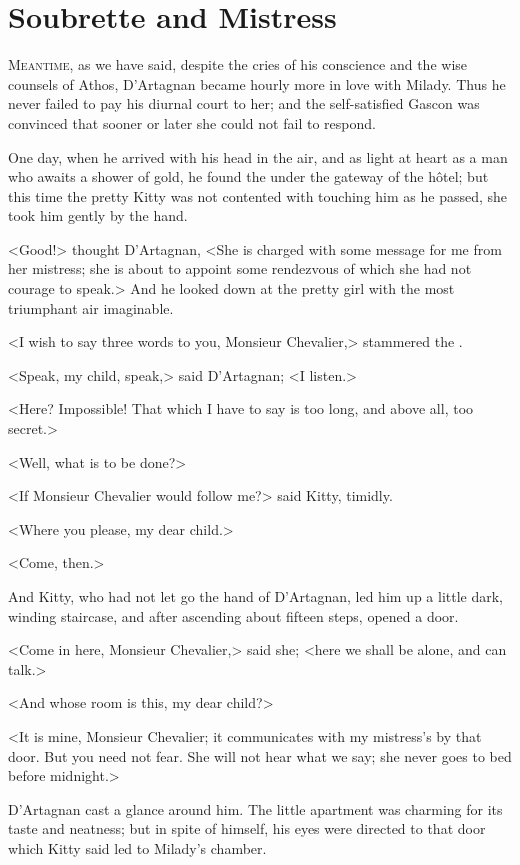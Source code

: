 
\chapter{Soubrette and Mistress}

\lettrine{M}{eantime,} as we have said, despite the cries of his conscience and the wise counsels of Athos, D'Artagnan became hourly more in love with Milady. Thus he never failed to pay his diurnal court to her; and the self-satisfied Gascon was convinced that sooner or later she could not fail to respond. 

One day, when he arrived with his head in the air, and as light at heart as a man who awaits a shower of gold, he found the  under the gateway of the hôtel; but this time the pretty Kitty was not contented with touching him as he passed, she took him gently by the hand. 

<Good!> thought D'Artagnan, <She is charged with some message for me from her mistress; she is about to appoint some rendezvous of which she had not courage to speak.> And he looked down at the pretty girl with the most triumphant air imaginable. 

<I wish to say three words to you, Monsieur Chevalier,> stammered the . 

<Speak, my child, speak,> said D'Artagnan; <I listen.> 

<Here? Impossible! That which I have to say is too long, and above all, too secret.> 

<Well, what is to be done?> 

<If Monsieur Chevalier would follow me?> said Kitty, timidly. 

<Where you please, my dear child.> 

<Come, then.> 

And Kitty, who had not let go the hand of D'Artagnan, led him up a little dark, winding staircase, and after ascending about fifteen steps, opened a door. 

<Come in here, Monsieur Chevalier,> said she; <here we shall be alone, and can talk.> 

<And whose room is this, my dear child?> 

<It is mine, Monsieur Chevalier; it communicates with my mistress's by that door. But you need not fear. She will not hear what we say; she never goes to bed before midnight.> 

D'Artagnan cast a glance around him. The little apartment was charming for its taste and neatness; but in spite of himself, his eyes were directed to that door which Kitty said led to Milady's chamber. 

